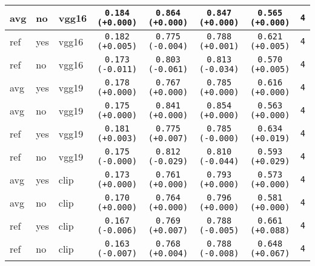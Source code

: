 \begin{tabular}{|l|l|l|c|c|c|c|c|}
\rowcolor{verylightgray}avg & no & vgg16 & \texttt{0.184 {\color{black}(+0.000)}} & \texttt{0.864 {\color{black}(+0.000)}} & \texttt{0.847 {\color{black}(+0.000)}} & \texttt{0.565 {\color{black}(+0.000)}} & \texttt{4} \\
\hline
ref & yes & vgg16 & \texttt{0.182 {\color{green}(+0.005)}} & \texttt{0.775 {\color{green}(-0.004)}} & \texttt{0.788 {\color{red}(+0.001)}} & \texttt{0.621 {\color{green}(+0.005)}} & \texttt{4} \\
ref & no & vgg16 & \texttt{0.173 {\color{red}(-0.011)}} & \texttt{0.803 {\color{green}(-0.061)}} & \texttt{0.813 {\color{green}(-0.034)}} & \texttt{0.570 {\color{green}(+0.005)}} & \texttt{4} \\
\hline
\rowcolor{verylightgray}avg & yes & vgg19 & \texttt{0.178 {\color{black}(+0.000)}} & \texttt{0.767 {\color{black}(+0.000)}} & \texttt{0.785 {\color{black}(+0.000)}} & \texttt{0.616 {\color{black}(+0.000)}} & \texttt{4} \\
\rowcolor{verylightgray}avg & no & vgg19 & \texttt{0.175 {\color{black}(+0.000)}} & \texttt{0.841 {\color{black}(+0.000)}} & \texttt{0.854 {\color{black}(+0.000)}} & \texttt{0.563 {\color{black}(+0.000)}} & \texttt{4} \\
\hline
ref & yes & vgg19 & \texttt{0.181 {\color{green}(+0.003)}} & \texttt{0.775 {\color{red}(+0.007)}} & \texttt{0.785 {\color{black}(-0.000)}} & \texttt{0.634 {\color{green}(+0.019)}} & \texttt{4} \\
ref & no & vgg19 & \texttt{0.175 {\color{black}(-0.000)}} & \texttt{0.812 {\color{green}(-0.029)}} & \texttt{0.810 {\color{green}(-0.044)}} & \texttt{0.593 {\color{green}(+0.029)}} & \texttt{4} \\
\hline
\rowcolor{verylightgray}avg & yes & clip & \texttt{0.173 {\color{black}(+0.000)}} & \texttt{0.761 {\color{black}(+0.000)}} & \texttt{0.793 {\color{black}(+0.000)}} & \texttt{0.573 {\color{black}(+0.000)}} & \texttt{4} \\
\rowcolor{verylightgray}avg & no & clip & \texttt{0.170 {\color{black}(+0.000)}} & \texttt{0.764 {\color{black}(+0.000)}} & \texttt{0.796 {\color{black}(+0.000)}} & \texttt{0.581 {\color{black}(+0.000)}} & \texttt{4} \\
\hline
ref & yes & clip & \texttt{0.167 {\color{red}(-0.006)}} & \texttt{0.769 {\color{red}(+0.007)}} & \texttt{0.788 {\color{green}(-0.005)}} & \texttt{0.661 {\color{green}(+0.088)}} & \texttt{4} \\
ref & no & clip & \texttt{0.163 {\color{red}(-0.007)}} & \texttt{0.768 {\color{red}(+0.004)}} & \texttt{0.788 {\color{green}(-0.008)}} & \texttt{0.648 {\color{green}(+0.067)}} & \texttt{4} \\
\hline
\end{tabular}
